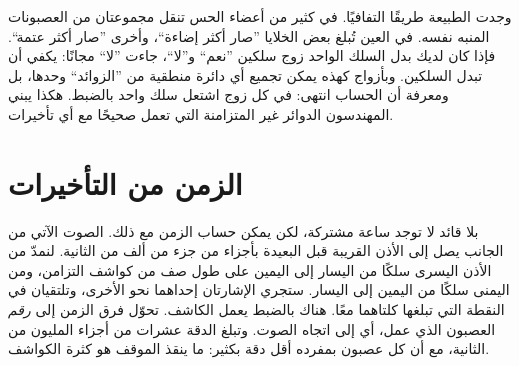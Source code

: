 وجدت الطبيعة طريقًا التفافيًا. في كثير من أعضاء الحس تنقل مجموعتان من العصبونات المنبه نفسه. في العين تُبلغ بعض الخلايا ”صار أكثر إضاءة“، وأخرى ”صار أكثر عتمة“. فإذا كان لديك بدل السلك الواحد زوج سلكين ”نعم“ و”لا“، جاءت ”لا“ مجانًا: يكفي أن تبدل السلكين. وبأزواج كهذه يمكن تجميع أي دائرة منطقية من ”الزوائد“ وحدها، بل ومعرفة أن الحساب انتهى: في كل زوج اشتعل سلك واحد بالضبط. هكذا يبني المهندسون الدوائر غير المتزامنة التي تعمل صحيحًا مع أي تأخيرات.

\section*{الزمن من التأخيرات}

بلا قائد لا توجد ساعة مشتركة، لكن يمكن حساب الزمن مع ذلك. الصوت الآتي من الجانب يصل إلى الأذن القريبة قبل البعيدة بأجزاء من جزء من ألف من الثانية. لنمدّ من الأذن اليسرى سلكًا من اليسار إلى اليمين على طول صف من كواشف التزامن، ومن اليمنى سلكًا من اليمين إلى اليسار. ستجري الإشارتان إحداهما نحو الأخرى، وتلتقيان في النقطة التي تبلغها كلتاهما معًا. هناك بالضبط يعمل الكاشف. تحوّل فرق الزمن إلى \emph{رقم} العصبون الذي عمل، أي إلى اتجاه الصوت. وتبلغ الدقة عشرات من أجزاء المليون من الثانية، مع أن كل عصبون بمفرده أقل دقة بكثير: ما ينقذ الموقف هو كثرة الكواشف.


